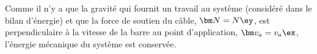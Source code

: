 \par\vspace{2mm}
Comme il n'y a que la gravité qui fournit un travail au système (considéré dans le bilan d'énergie) et que la force de soutien du câble, $\bm N=N\ey$, est perpendiculaire à la vitesse de la barre au point d'application, $\bm v_a = v_a \ex $, l'énergie mécanique du système est conservée.
